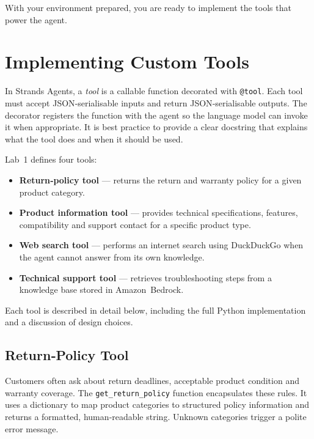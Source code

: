 With your environment prepared, you are ready to implement the tools that
power the agent.

\section{Implementing Custom Tools}

In Strands Agents, a \emph{tool} is a callable function decorated with
\texttt{@tool}.  Each tool must accept JSON‑serialisable inputs and return
JSON‑serialisable outputs.  The decorator registers the function with the
agent so the language model can invoke it when appropriate.  It is best
practice to provide a clear docstring that explains what the tool does and
when it should be used.

Lab 1 defines four tools:

\begin{itemize}
  \item \textbf{Return‑policy tool} — returns the return and warranty policy for
        a given product category.
  \item \textbf{Product information tool} — provides technical
        specifications, features, compatibility and support contact for a
        specific product type.
  \item \textbf{Web search tool} — performs an internet search using
        DuckDuckGo when the agent cannot answer from its own knowledge.
  \item \textbf{Technical support tool} — retrieves troubleshooting steps from
        a knowledge base stored in Amazon Bedrock.
\end{itemize}

Each tool is described in detail below, including the full Python
implementation and a discussion of design choices.

\subsection{Return‑Policy Tool}

Customers often ask about return deadlines, acceptable product condition and
warranty coverage.  The \texttt{get\_return\_policy} function encapsulates
these rules.  It uses a dictionary to map product categories to structured
policy information and returns a formatted, human‑readable string.  Unknown
categories trigger a polite error message.

